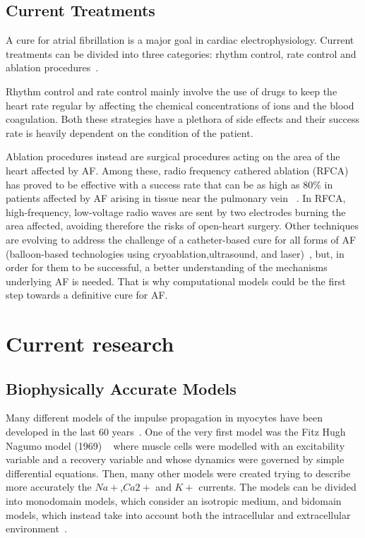 \documentclass{article}
\begin{document}
\subsection{ Current Treatments }


A cure for atrial fibrillation is a major goal in cardiac electrophysiology. Current treatments can be divided into three categories: rhythm control, rate control and ablation procedures~\cite{article_aftreatments}. 

Rhythm control and rate control mainly involve the use of drugs to keep the heart rate regular by affecting the chemical concentrations of ions and the blood coagulation. Both these strategies have a plethora of side effects and their success rate is heavily dependent on the condition of the patient. 

Ablation procedures instead are surgical procedures acting on the area of the heart affected by AF. Among these, radio frequency cathered ablation (RFCA) has proved to be effective with a success rate that can be as high as 80\% in patients affected by AF arising in tissue near the pulmonary vein ~\cite{cardiacphys_raterythmcontrol}. In RFCA, high-frequency, low-voltage radio waves are sent by two electrodes burning the area affected, avoiding therefore the risks of open-heart surgery. Other techniques are evolving to address the challenge of a catheter-based cure for all forms of AF (balloon-based technologies using cryoablation,ultrasound, and laser)~\cite{article_afablation}, but, in order for them to be successful, a better understanding of the mechanisms underlying AF is needed. That is why computational models could be the first step towards a definitive cure for AF. 


 
 

\section{ Current research} 
 
\subsection{ Biophysically Accurate Models }
 
Many different models of the impulse propagation in myocytes have been developed in the last 60 years~\cite{physmodel_review}. 
One of the very first model was the Fitz Hugh Nagumo model (1969) ~\cite{physmodel_fhnrabbit2014} where muscle cells were modelled with an excitability variable and a recovery variable and whose dynamics were governed by simple differential equations.  Then, many other models were created trying to describe more accurately the $Na+$,$Ca2+$ and $K+$ currents. The models can be divided into monodomain models, which consider an isotropic medium, and bidomain models, which instead take into account both the intracellular and extracellular environment~\cite{kim_computationalmodels2001}. 
\end{document}
